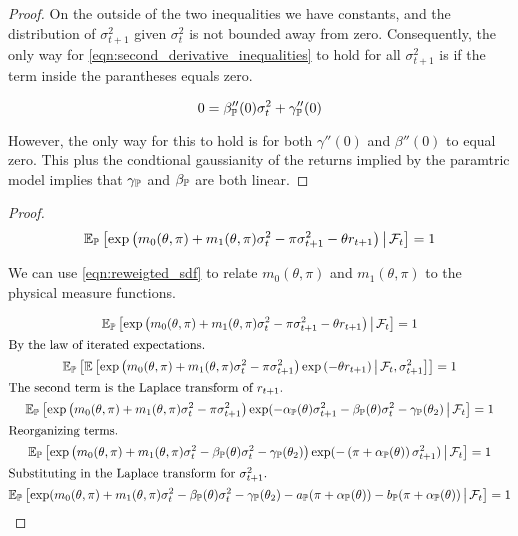\documentclass[11pt, letterpaper, twoside, final]{article}
\begin{document}
\begin{appendices}
\begin{proof}
    On the outside of the two inequalities we have constants, and the distribution of $\sigma^2_{t+1}$ given
    $\sigma^2_t$ is not bounded away from zero.
    Consequently, the only way for \cref{eqn:second_derivative_inequalities} to hold for all $\sigma^2_{t+1}$ is
    if the term inside the parantheses equals  zero.

    \begin{equation}
        0 = \beta_{\mathbb{P}}''(0) \sigma^2_t + \gamma_{\mathbb{P}}''(0)
    \end{equation}

    However, the only way for this to hold is for both $\gamma''(0)$ and $\beta''(0)$ to equal zero.
    This plus the condtional gaussianity of the returns implied by the paramtric model implies that $\gamma_{\mathbb{P}}$
    and $\beta_{\mathbb{P}}$  are both linear.

\end{proof}


\sdfConstants*

\begin{proof}

\begin{equation}
    \label{eqn:reweigted_sdf}
    \operatorname{\mathbb{E}}_{\mathbb{P}}\left[\exp\left(m_0(\theta, \pi) + m_1(\theta, \pi) \sigma^2_t - \pi \sigma^2_{t+1} - \theta r_{t+1}
    \right) \,\middle\vert\, \mathcal{F}_t \right] = 1 
\end{equation}

We can use \cref{eqn:reweigted_sdf} to relate $m_0(\theta, \pi)$ and $m_1(\theta, \pi)$ to the physical measure
functions. 

\begin{gather}
    \operatorname{\mathbb{E}}_{\mathbb{P}}\left[\exp\left(m_0(\theta, \pi) + m_1(\theta, \pi) \sigma^2_t - \pi \sigma^2_{t+1} - \theta r_{t+1}
    \right) \,\middle\vert\, \mathcal{F}_t \right] = 1 \\
    \intertext{By the law of iterated expectations.}
    \operatorname{\mathbb{E}}_{\mathbb{P}}\left[ \operatorname{\mathbb{E}}\left[\exp\left(m_0(\theta, \pi) + m_1(\theta, \pi) \sigma^2_t - \pi \sigma^2_{t+1}\right)
        \exp\left( - \theta r_{t+1}\right) \,\middle\vert\, \mathcal{F}_t, \sigma^2_{t+1} \right]\right] = 1 \\
    \intertext{The second term is the Laplace transform of $r_{t+1}$.}
    \operatorname{\mathbb{E}}_{\mathbb{P}}\left[\exp\left(m_0(\theta, \pi) + m_1(\theta, \pi) \sigma^2_t - \pi \sigma^2_{t+1} \right)
        \exp(-\alpha_{\mathbb{P}}(\theta) \sigma^2_{t+1} - \beta_{\mathbb{P}}(\theta) \sigma^2_{t} - \gamma_{\mathbb{P}}(\theta_2)
        \,\middle\vert\, \mathcal{F}_t \right] = 1 \\
    \intertext{Reorganizing terms.}
    \operatorname{\mathbb{E}}_{\mathbb{P}}\left[\exp\left(m_0(\theta, \pi) + m_1(\theta, \pi) \sigma^2_t - \beta_{\mathbb{P}}(\theta) \sigma^2_{t} -
        \gamma_{\mathbb{P}}(\theta_2) \right) \exp(-\left(\pi + \alpha_{\mathbb{P}}(\theta)\right) \sigma^2_{t+1}) \,\middle\vert\, \mathcal{F}_t
        \right] = 1 \\ 
    \intertext{Substituting in the Laplace transform for $\sigma^2_{t+1}$.} 
    \label{eqn:expected_sdf_wrt_PP}
    \operatorname{\mathbb{E}}_{\mathbb{P}}\left[\exp(m_0(\theta, \pi) + m_1(\theta, \pi) \sigma^2_t - \beta_{\mathbb{P}}(\theta) \sigma^2_{t} -
        \gamma_{\mathbb{P}}(\theta_2)  - a_{\mathbb{P}}(\pi + \alpha_{\mathbb{P}}(\theta)) - b_{\mathbb{P}}(\pi + \alpha_{\mathbb{P}}(\theta))
        \,\middle\vert\, \mathcal{F}_t \right] = 1 
\end{gather}


\end{proof}
\end{appendices}
\end{document}
